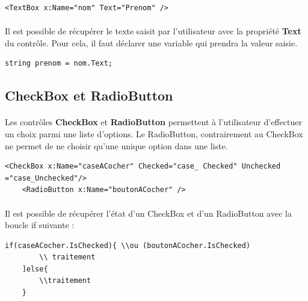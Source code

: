 \documentclass[twoside,UTF8]{EPURapport}
\begin{document}
\begin{lstlisting}[caption={Exemple d'utilisation du contrôle \textbf{TextBox}}]
    <TextBox x:Name="nom" Text="Prenom" />
\end{lstlisting}

\paragraph{}
Il est possible de récupérer le texte saisit par l'utilisateur avec la propriété \textbf{Text} du contrôle. Pour cela, il faut déclarer une variable qui prendra la valeur saisie.

\begin{lstlisting}[caption={Récupération du texte saisit}]
	string prenom = nom.Text;
\end{lstlisting}
		
		\subsection{CheckBox et RadioButton}

\paragraph{}
Les contrôles \textbf{CheckBox} et \textbf{RadioButton} permettent à l'utilisateur d'effectuer un choix parmi une liste d'options. Le RadioButton, contrairement au CheckBox ne permet de ne choisir qu'une unique option dans une liste. 

\begin{lstlisting}[caption={Exemple d'utilisation du contrôle \textbf{CheckBox} et \textbf{RadioButton}}]
    <CheckBox x:Name="caseACocher" Checked="case_ Checked" Unchecked ="case_Unchecked"/>
    <RadioButton x:Name="boutonACocher" />
\end{lstlisting}

\paragraph{}
Il est possible de récupérer l'état d'un CheckBox et d'un RadioButton avec la boucle if suivante : 

\begin{lstlisting}[caption={Récupération de l'état d'un \textbf{CheckBox} et d'un \textbf{RadioButton}}]
	if(caseACocher.IsChecked){ \\ou (boutonACocher.IsChecked)
		\\ traitement
	]else{
		\\traitement
	}
\end{lstlisting}
\end{document}
